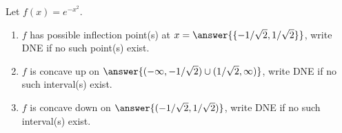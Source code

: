 \documentclass{ximera}
\author{Gregory Hartman \and Matthew Carr}
\begin{document}
\begin{exercise}






Let $f(x)=e^{-x^{2}}$.
\begin{enumerate}
\item		$f$ has possible inflection point(s) at $x=\answer{\{-1/\sqrt{2},1/\sqrt{2}\}}$, write DNE if no such point(s) exist.
\item		$f$ is concave up on $\answer{(-\infty,-1/\sqrt{2})\cup(1/\sqrt{2},\infty)}$, write DNE if no such interval(s) exist.
\item		$f$ is concave down on $\answer{(-1/\sqrt{2},1/\sqrt{2})}$, write DNE if no such interval(s) exist.
\end{enumerate}

\end{exercise}
\end{document}
